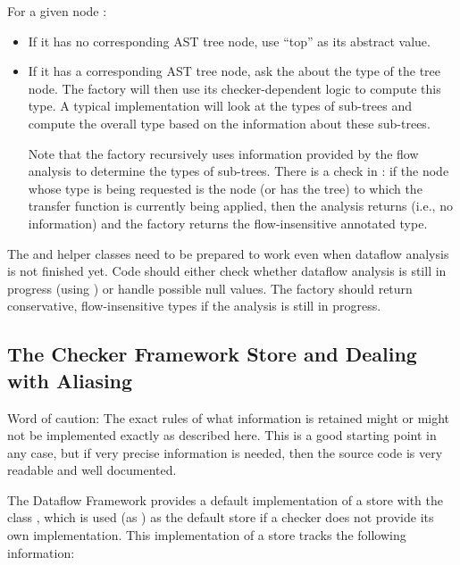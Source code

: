 For a given node :
\begin{itemize}
\item
    If it has no corresponding AST tree node, use ``top'' as its
    abstract value.
\item
    If it has a corresponding AST tree node, ask the
     about the type of the tree node.  The
    factory will then use its checker-dependent logic to compute this
    type.  A typical implementation will look at the types of sub-trees
    and compute the overall type based on the information about these
    sub-trees.

    Note that the factory recursively uses information provided by the
    flow analysis to determine the types of sub-trees.  There is a
    check in :  if the node whose type is
    being requested is the node (or has the tree) to which the transfer
    function is currently being applied, then the
    analysis returns  (i.e., no information) and the
    factory returns the flow-insensitive annotated type.

\end{itemize}

The  and helper classes need to be prepared to work
even when dataflow analysis is not finished yet. Code should either check
whether dataflow analysis is still in progress (using
) or handle possible null values. The factory should
return conservative, flow-insensitive types if the analysis is still in
progress.


\subsection{The Checker Framework Store and Dealing with Aliasing}

\begin{workinprogress}
    Word of caution: The exact rules of what information is
        retained might or might not be implemented exactly as described
        here.  This is a good starting point in any case, but if very
        precise information is needed, then the source code is very
        readable and well documented.
\end{workinprogress}

The Dataflow Framework provides a default implementation of a store
with the class , which is used (as
) as the default store if a checker does not provide its
own implementation.  This implementation of a store tracks the
following information:

